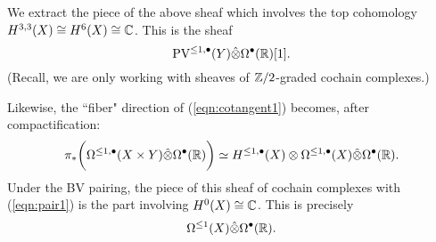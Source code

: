 \documentclass[11pt]{article}
\newcommand\bu{\bullet}
\begin{document}
We extract the piece of the above sheaf which involves the top cohomology $H^{3,3}(X) \cong H^6(X) \cong \mathbb{C}$. 
This is the sheaf
\begin{equation}\label{eqn:pair1}
\PV^{\leq 1, \bu}(Y) \Hat{\otimes} \Omega^\bu (\mb R) [1] .
\end{equation}
(Recall, we are only working with sheaves of $\mathbb{Z}/2$-graded cochain complexes.)

Likewise, the ``fiber" direction of (\ref{eqn:cotangent1}) becomes, after compactification:
\[
\pi_* \bigg(\Omega^{\leq 1, \bu}(X \times Y) \Hat{\otimes} \Omega^\bu(\mb R) \bigg) \simeq H^{\leq 1, \bu}(X) \otimes \Omega^{\leq 1, \bu} (X) \Hat{\otimes} \Omega^\bu (\mb R)  .
\]
Under the BV pairing, the piece of this sheaf of cochain complexes with (\ref{eqn:pair1}) is the part involving $H^0(X) \cong \mathbb{C}$.
This is precisely
\[
\Omega^{\leq 1}(X) \Hat{\otimes} \Omega^\bu (\mb R) .
\] 
\end{document}
